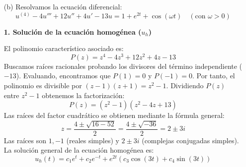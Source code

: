 {\begin{enumerate}
        \textbf{2. Solución particular ($u_p$)}

        Aplicamos el principio de superposición para el término no homogéneo $f(t) = 1 + e^{2t}$.

        Para el término constante $1$, como $0$ no es raíz del polinomio característico, proponemos una constante $u_{p1} = K$:
        \[
            P(D) u_{p1} = 1 \implies P(D) K = 1 \iff -25K = 1 \implies K = -\frac{1}{25}
        \]

        Para el término exponencial $e^{2t}$, como $2$ no es raíz de $P(z)$, proponemos $u_{p2} = m e^{2t}$. Utilizamos la propiedad $P(D)e^{\alpha t} = P(\alpha)e^{\alpha t}$:
        \[
            P(D) (m e^{2t}) = e^{2t} \implies m P(2) e^{2t} = e^{2t}
        \]
        Evaluamos $P(z)$ en $z=2$:
        \[
            P(2) = (2-1)(2+1)\left( (2-2)^2 + 1 \right)^2 = (1)(3)(1)^2 = 3
        \]
        Sustituyendo en la ecuación:
        \[
            m \cdot 3 \cdot e^{2t} = e^{2t} \implies 3m = 1 \implies m = \frac{1}{3}
        \]
        La solución particular total es:
        \[
            u_p(t) = -\frac{1}{25} + \frac{1}{3}e^{2t}
        \]

        \textbf{3. Solución general}

        La solución general de la ecuación diferencial es la suma de la solución homogénea y la particular ($u = u_h + u_p$).
        \[
            u(t) = c_1 e^t + c_2 e^{-t} + e^{2t}(c_3 \cos t + c_4 \sin t + c_5 t \cos t + c_6 t \sin t) - \frac{1}{25} + \frac{1}{3}e^{2t}
        \]
        donde $c_i \in \mathbb{R}$ son constantes arbitrarias.
        \item[(b)]
        Resolvamos la ecuación diferencial:
        \[
            u^{(4)} - 4u''' + 12u'' + 4u' - 13u = 1 + e^{2t} + \cos(\omega t) \quad (\text{con } \omega > 0)
        \]

        \textbf{1. Solución de la ecuación homogénea ($u_h$)}

        El polinomio característico asociado es:
        \[
            P(z) = z^4 - 4z^3 + 12z^2 + 4z - 13
        \]
        Buscamos raíces racionales probando los divisores del término independiente ($-13$). Evaluando, encontramos que $P(1) = 0$ y $P(-1) = 0$. Por tanto, el polinomio es divisible por $(z-1)(z+1) = z^2 - 1$.
        Dividiendo $P(z)$ entre $z^2 - 1$ obtenemos la factorización:
        \[
            P(z) = (z^2 - 1)(z^2 - 4z + 13)
        \]
        Las raíces del factor cuadrático se obtienen mediante la fórmula general:
        \[
            z = \frac{4 \pm \sqrt{16 - 52}}{2} = \frac{4 \pm \sqrt{-36}}{2} = 2 \pm 3i
        \]
        Las raíces son $1, -1$ (reales simples) y $2 \pm 3i$ (complejas conjugadas simples). La solución general de la ecuación homogénea es:
        \[
            u_h(t) = c_1 e^t + c_2 e^{-t} + e^{2t}(c_3 \cos(3t) + c_4 \sin(3t))
        \]


\end{enumerate}}
